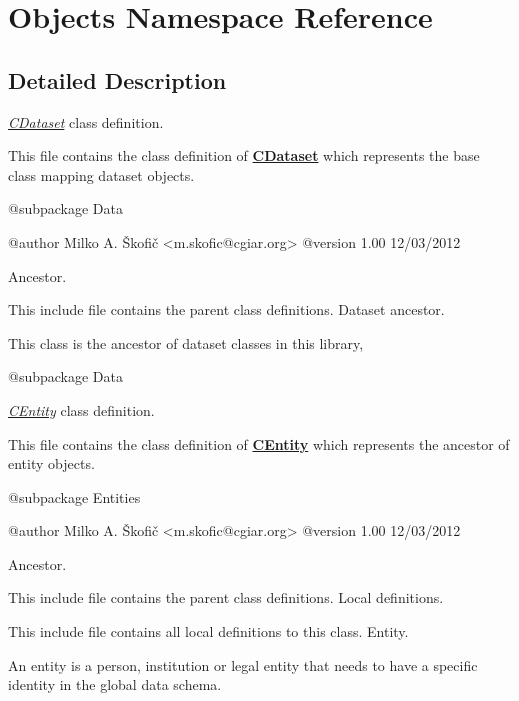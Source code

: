 \hypertarget{namespace_objects}{\section{Objects Namespace Reference}
\label{namespace_objects}
}


\subsection{Detailed Description}
{\itshape \hyperlink{class_c_dataset}{C\-Dataset}\/} class definition.

This file contains the class definition of {\bfseries \hyperlink{class_c_dataset}{C\-Dataset}} which represents the base class mapping dataset objects.

\begin{DoxyVerb}    @subpackage     Data

    @author         Milko A. Škofič <m.skofic@cgiar.org>
    @version        1.00 12/03/2012\end{DoxyVerb}


Ancestor.

This include file contains the parent class definitions. Dataset ancestor.

This class is the ancestor of dataset classes in this library,

\begin{DoxyVerb}    @subpackage     Data\end{DoxyVerb}


{\itshape \hyperlink{class_c_entity}{C\-Entity}\/} class definition.

This file contains the class definition of {\bfseries \hyperlink{class_c_entity}{C\-Entity}} which represents the ancestor of entity objects.

\begin{DoxyVerb}    @subpackage     Entities

    @author         Milko A. Škofič <m.skofic@cgiar.org>
    @version        1.00 12/03/2012\end{DoxyVerb}


Ancestor.

This include file contains the parent class definitions. Local definitions.

This include file contains all local definitions to this class. Entity.

An entity is a person, institution or legal entity that needs to have a specific identity in the global data schema.

